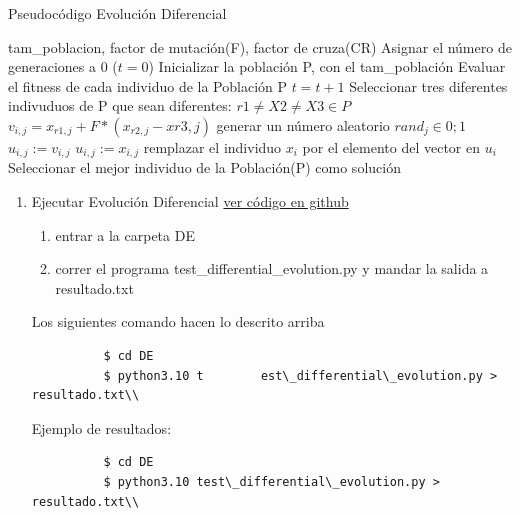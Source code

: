 \documentclass{article}
\begin{document}
\begin{algorithm} \caption{Pseudocódigo Evolución Diferencial}
  \begin{algorithmic}[1]
    \Require tam\_poblacion, factor de mutación(F), factor de cruza(CR)
    \State Asignar el número de generaciones a 0 ($t=0$)
    \State Inicializar la población P, con el tam\_población
    \State Evaluar el fitness de cada individuo de la Población P
    \Repeat
    $t=t+1$
    \State Seleccionar tres diferentes indivuduos de P que sean diferentes: $r1\neq X2 \neq X3 \in P$
    \State $v_{i,j} = x_{r1,j} + F * (x_{r2,j}-x{r3,j})$
    \State generar un número aleatorio $rand_{j} \in \mathcal 0;1$
    \State $u_{i,j} := v_{i,j}$
    \Else
    \State $u_{i,j}:=x_{i,j}$
    \EndIf
    \EndFor
    \State remplazar el individuo $x_i$ por el elemento del vector en $u_{i}$
    \EndIf
    \EndFor
    \State Seleccionar el mejor individuo de la Población(P) como solución
  \end{algorithmic}
\end{algorithm}

\begin{enumerate}
  \item Ejecutar Evolución Diferencial
    \href{https://github.com/luisballado/ADA/blob/main/practice_code/tarea1.cpp}{ver código en github}\\
    \begin{enumerate}
    \item entrar a la carpeta DE \\
    \item correr el programa test\_differential\_evolution.py y mandar la salida a resultado.txt\\
    \end{enumerate} 

    Los siguientes comando hacen lo descrito arriba
    
    \begin{commandline}
        \begin{verbatim}
          $ cd DE
          $ python3.10 t        est\_differential\_evolution.py > resultado.txt\\
        \end{verbatim}
    \end{commandline}

    Ejemplo de resultados:

    \begin{commandline}
        \begin{verbatim}
          $ cd DE
          $ python3.10 test\_differential\_evolution.py > resultado.txt\\
        \end{verbatim}
    \end{commandline}
\end{enumerate} 
\end{document}
